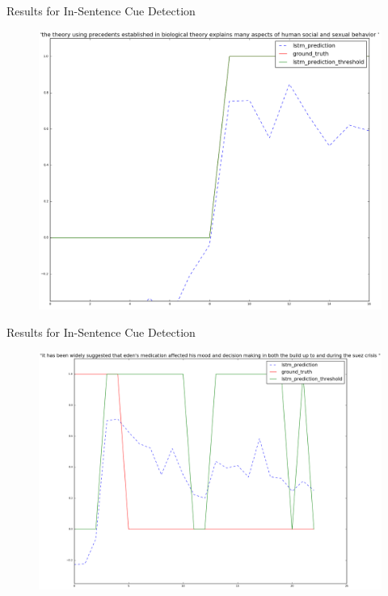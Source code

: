 \documentclass{beamer}
\begin{document}
\begin{frame}{Results for In-Sentence Cue Detection}
	\begin{figure}[htbp]
		\includegraphics[scale=0.3]{images/task2_1dir/25_type1}
	\end{figure}
\end{frame}
\begin{frame}{Results for In-Sentence Cue Detection}
	\begin{figure}[htbp]
		\includegraphics[scale=0.3]{images/task2_1dir/35_type1}
	\end{figure}
\end{frame}
\end{document}
